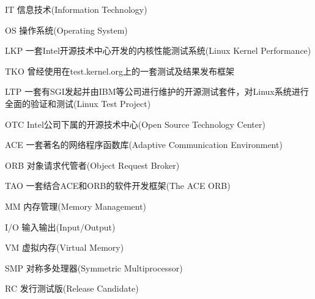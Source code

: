
\begin{denotation}
\item[IT] 信息技术(Information Technology)
\item[OS] 操作系统(Operating System)
\item[LKP] 一套Intel开源技术中心开发的内核性能测试系统(Linux Kernel Performance)
\item[TKO] 曾经使用在test.kernel.org上的一套测试及结果发布框架
\item[LTP] 一套有SGI发起并由IBM等公司进行维护的开源测试套件，对Linux系统进行全面的验证和测试(Linux Test Project)
\item[OTC] Intel公司下属的开源技术中心(Open Source Technology Center)
\item[ACE] 一套著名的网络程序函数库(Adaptive Communication Environment)
\item[ORB] 对象请求代管者(Object Request Broker) 
\item[TAO] 一套结合ACE和ORB的软件开发框架(The ACE ORB)
\item[MM] 内存管理(Memory Management)
\item[I/O] 输入输出(Input/Output)
\item[VM] 虚拟内存(Virtual Memory)
\item[SMP] 对称多处理器(Symmetric Multiprocessor)
\item[RC] 发行测试版(Release Candidate)


\end{denotation}